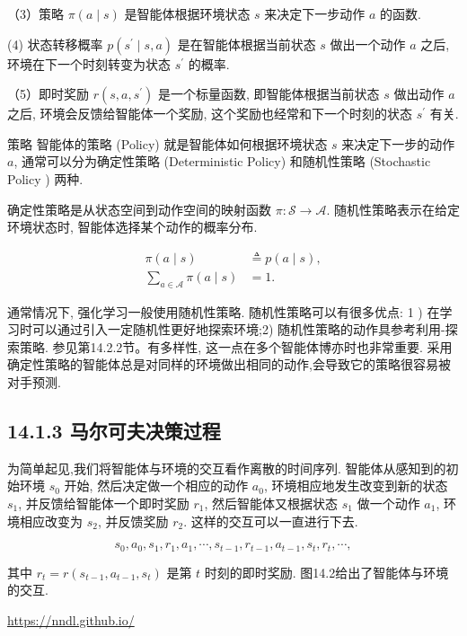 \documentclass[10pt]{article}
\begin{document}
（3）策略 $\pi(a \mid s)$ 是智能体根据环境状态 $s$ 来决定下一步动作 $a$ 的函数.

(4) 状态转移概率 $p\left(s^{\prime} \mid s, a\right)$ 是在智能体根据当前状态 $s$ 做出一个动作 $a$ 之后, 环境在下一个时刻转变为状态 $s^{\prime}$ 的概率.

（5）即时奖励 $r\left(s, a, s^{\prime}\right)$ 是一个标量函数, 即智能体根据当前状态 $s$ 做出动作 $a$ 之后, 环境会反馈给智能体一个奖励, 这个奖励也经常和下一个时刻的状态 $s^{\prime}$ 有关.

策略 智能体的策略 (Policy) 就是智能体如何根据环境状态 $s$ 来决定下一步的动作 $a$, 通常可以分为确定性策略 (Deterministic Policy) 和随机性策略 (Stochastic Policy ) 两种.

确定性策略是从状态空间到动作空间的映射函数 $\pi: \mathcal{S} \rightarrow \mathcal{A}$. 随机性策略表示在给定环境状态时, 智能体选择某个动作的概率分布.


\begin{align*}
\pi(a \mid s) & \triangleq p(a \mid s),  \tag{14.1}\\
\sum_{a \in \mathcal{A}} \pi(a \mid s) & =1 . \tag{14.2}
\end{align*}


通常情况下, 强化学习一般使用随机性策略. 随机性策略可以有很多优点: 1 ) 在学习时可以通过引入一定随机性更好地探索环境;2) 随机性策略的动作具参考利用-探索策略. 参见第14.2.2节。有多样性, 这一点在多个智能体博亦时也非常重要. 采用确定性策略的智能体总是对同样的环境做出相同的动作,会导致它的策略很容易被对手预测.

\subsection*{14.1.3 马尔可夫决策过程}
为简单起见,我们将智能体与环境的交互看作离散的时间序列. 智能体从感知到的初始环境 $s_{0}$ 开始, 然后决定做一个相应的动作 $a_{0}$, 环境相应地发生改变到新的状态 $s_{1}$, 并反馈给智能体一个即时奖励 $r_{1}$, 然后智能体又根据状态 $s_{1}$ 做一个动作 $a_{1}$, 环境相应改变为 $s_{2}$, 并反馈奖励 $r_{2}$. 这样的交互可以一直进行下去.


\begin{equation*}
s_{0}, a_{0}, s_{1}, r_{1}, a_{1}, \cdots, s_{t-1}, r_{t-1}, a_{t-1}, s_{t}, r_{t}, \cdots, \tag{14.3}
\end{equation*}


其中 $r_{t}=r\left(s_{t-1}, a_{t-1}, s_{t}\right)$ 是第 $t$ 时刻的即时奖励. 图14.2给出了智能体与环境的交互.

\href{https://nndl.github.io/}{https://nndl.github.io/}
\end{document}
